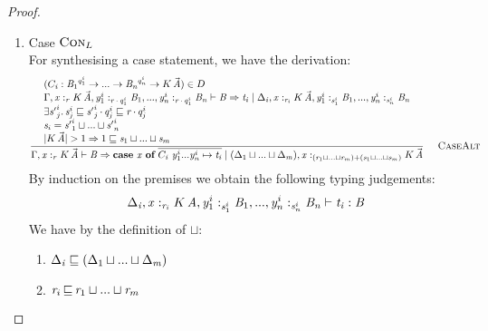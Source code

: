 \begin{proof}
\begin{enumerate}
\item Case $\textsc{Con}_{L}$ \\
        For synthesising a case statement, we have the derivation:
        \begin{align*}
          \synCaseAlt
        \end{align*}
        By induction on the premises we obtain the following typing judgements:
        \begin{align*}
          \Delta_{\GRANULEmv{i}}  \GRANULEsym{,}   \GRANULEmv{x}  :_{\textcolor{coeffectColor}{   \GRANULEnt{r_{\GRANULEmv{i}}}   } }    K  \, \GRANULEnt{A}    \GRANULEsym{,}   {  \GRANULEmv{y} ^  i  _  1   }:_{\textcolor{coeffectColor}{    \GRANULEnt{s} ^  i  _  1     } }   \GRANULEnt{B_{{\mathrm{1}}}}    , ... ,   {  \GRANULEmv{y} ^  i  _  n   }:_{\textcolor{coeffectColor}{    \GRANULEnt{s} ^  i  _  n     } }   \GRANULEnt{B_{\GRANULEmv{n}}}    \vdash  \GRANULEnt{t_{\GRANULEmv{i}}}  :  \GRANULEnt{B}
        \end{align*}
        We have by the definition of $\sqcup$:
        \begin{enumerate}
                \item $ \Delta_{\mathit{i}} \sqsubseteq (   \Delta_{{\mathrm{1}}}  \sqcup ...  \sqcup  \Delta_{\mathit{m}}   )$
                \item $ \GRANULEnt{r} _  i     \, \textcolor{coeffectColor}{\sqsubseteq} \,      \GRANULEnt{r} _  1     \sqcup ... \sqcup    \GRANULEnt{r} _  m$
        \end{enumerate}


\end{enumerate}
\end{proof}

